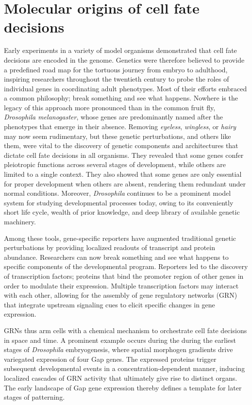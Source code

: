 \section{Molecular origins of cell fate decisions}

Early experiments in a variety of model organisms demonstrated that cell fate decisions are encoded in the genome. Genetics were therefore believed to provide a predefined road map for the tortuous journey from embryo to adulthood, inspiring researchers throughout the twentieth century to probe the roles of individual genes in coordinating adult phenotypes. Most of their efforts embraced a common philosophy; break something and see what happens. Nowhere is the legacy of this approach more pronounced than in the common fruit fly, \textit{Drosophila melanogaster}, whose genes are predominantly named after the phenotypes that emerge in their absence. Removing \textit{eyeless}, \textit{wingless}, or \textit{hairy} may now seem rudimentary, but these genetic perturbations, and others like them, were vital to the discovery of genetic components and architectures that dictate cell fate decisions in all organisms. They revealed that some genes confer pleiotropic functions across several stages of development, while others are limited to a single context. They also showed that some genes are only essential for proper development when others are absent, rendering them redundant under normal conditions. Moreover, \emph{Drosophila} continues to be a prominent model system for studying developmental processes today, owing to its conveniently short life cycle, wealth of prior knowledge, and deep library of available genetic machinery.

Among these tools, gene-specific reporters have augmented traditional genetic perturbations by providing localized readouts of transcript and protein abundance. Researchers can now break something and see what happens to specific components of the developmental program. Reporters led to the discovery of transcription factors; proteins that bind the promoter region of other genes in order to modulate their expression. Multiple transcription factors may interact with each other, allowing for the assembly of gene regulatory networks (GRN) that integrate upstream signaling cues to elicit specific changes in gene expression. 

GRNs thus arm cells with a chemical mechanism to orchestrate cell fate decisions in space and time. A prominent example occurs during the during the earliest stages of \textit{Drosophila} embryogenesis, where spatial morphogen gradients drive variegated expression of four Gap genes. The expressed proteins trigger subsequent developmental events in a concentration-dependent manner, inducing localized cascades of GRN activity that ultimately give rise to distinct organs. The early landscape of Gap gene expression thereby defines a template for later stages of patterning.

